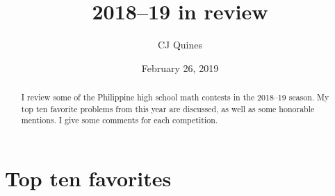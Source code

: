 \documentclass[11pt,paper=letter]{scrartcl}
\begin{document}
\title{2018--19 in review}
\author{CJ Quines}
\date{February 26, 2019}
\maketitle

\begin{abstract}
  I review some of the Philippine high school math contests in the 2018--19 season. My top ten favorite problems from this year are discussed, as well as some honorable mentions. I give some comments for each competition.
\end{abstract}

\section{Top ten favorites}
\end{document}

